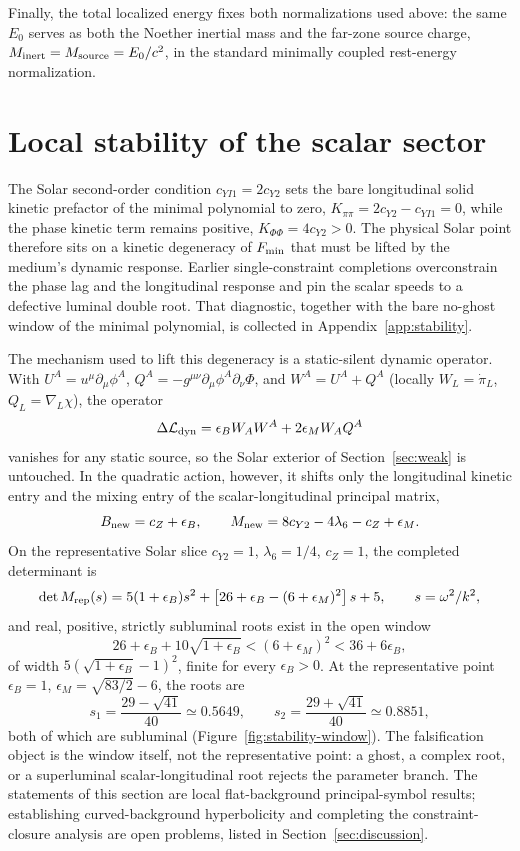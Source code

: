 \documentclass[12pt,a4paper]{article}
\begin{document}
Finally, the total localized energy fixes both normalizations used above:
the same $E_0$ serves as both the Noether inertial mass and the far-zone
source charge,
$M_{\rm inert}=M_{\rm source}=E_0/c^2$, in the standard minimally coupled
rest-energy normalization.

\section{Local stability of the scalar sector}
\label{sec:stability}

The Solar second-order condition $c_{YI1}=2c_{Y2}$ sets the bare longitudinal
solid kinetic prefactor of the minimal polynomial to zero,
$K_{\pi\pi}=2c_{Y2}-c_{YI1}=0$, while the phase kinetic term remains positive,
$K_{\Phi\Phi}=4c_{Y2}>0$. The physical Solar point therefore sits on a
kinetic degeneracy of $F_{\rm min}$ that must be lifted by the medium's
dynamic response. Earlier single-constraint completions overconstrain the
phase lag and the longitudinal response and pin the scalar speeds to a
defective luminal double root. That diagnostic, together with the bare
no-ghost window of the minimal polynomial, is collected in
Appendix~\ref{app:stability}.

The mechanism used to lift this degeneracy is a static-silent dynamic
operator. With
$U^A=u^\mu\partial_\mu\phi^A$, $Q^A=-g^{\mu\nu}\partial_\mu\phi^A
\partial_\nu\Phi$, and $W^A=U^A+Q^A$ (locally $W_L=\dot\pi_L$,
$Q_L=\nabla_L\chi$), the operator
\[
\Delta\mathcal L_{\rm dyn}
=\epsilon_B W_A W^A+2\epsilon_M W_A Q^A
\]
vanishes for any static source, so the Solar exterior of
Section~\ref{sec:weak} is untouched. In the quadratic action, however, it
shifts only the longitudinal kinetic entry and the mixing entry of the
scalar-longitudinal principal matrix,
\[
B_{\rm new}=c_Z+\epsilon_B,\qquad
M_{\rm new}=8c_{Y2}-4\lambda_6-c_Z+\epsilon_M .
\]
On the representative Solar slice $c_{Y2}=1$, $\lambda_6=1/4$, $c_Z=1$, the
completed determinant is
\[
\det M_{\rm rep}(s)
=5(1+\epsilon_B)s^2+\left[26+\epsilon_B-(6+\epsilon_M)^2\right]s+5,
\qquad s=\omega^2/k^2,
\]
and real, positive, strictly subluminal roots exist in the open window
\[
26+\epsilon_B+10\sqrt{1+\epsilon_B}<(6+\epsilon_M)^2<36+6\epsilon_B,
\]
of width $5(\sqrt{1+\epsilon_B}-1)^2$, finite for every $\epsilon_B>0$. At
the representative point $\epsilon_B=1$, $\epsilon_M=\sqrt{83/2}-6$, the roots
are
\[
s_1=\frac{29-\sqrt{41}}{40}\simeq0.5649,\qquad
s_2=\frac{29+\sqrt{41}}{40}\simeq0.8851,
\]
both of which are subluminal (Figure~\ref{fig:stability-window}). The
falsification object is the window itself, not the representative point: a
ghost, a complex root, or a superluminal scalar-longitudinal root rejects the
parameter branch. The statements of this section are local flat-background
principal-symbol results; establishing curved-background hyperbolicity and
completing the constraint-closure analysis are open problems, listed in
Section~\ref{sec:discussion}.
\end{document}

